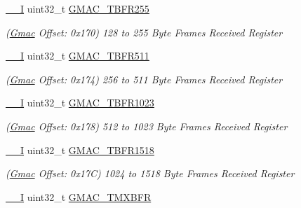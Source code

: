 \begin{DoxyCompactItemize}
\mbox{\hyperlink{core__cm7_8h_af63697ed9952cc71e1225efe205f6cd3}{\+\_\+\+\_\+I}} uint32\+\_\+t \mbox{\hyperlink{structGmac_ac0f973c8ea5412c3445ec37a342e0762}{G\+M\+A\+C\+\_\+\+T\+B\+F\+R255}}
\begin{DoxyCompactList}\small\item\em (\mbox{\hyperlink{structGmac}{Gmac}} Offset\+: 0x170) 128 to 255 Byte Frames Received Register \end{DoxyCompactList}\item 
\mbox{\label{structGmac_aa1e3416762c66cbee33559898f2612a8}} 
\mbox{\hyperlink{core__cm7_8h_af63697ed9952cc71e1225efe205f6cd3}{\+\_\+\+\_\+I}} uint32\+\_\+t \mbox{\hyperlink{structGmac_aa1e3416762c66cbee33559898f2612a8}{G\+M\+A\+C\+\_\+\+T\+B\+F\+R511}}
\begin{DoxyCompactList}\small\item\em (\mbox{\hyperlink{structGmac}{Gmac}} Offset\+: 0x174) 256 to 511 Byte Frames Received Register \end{DoxyCompactList}\item 
\mbox{\label{structGmac_a45ccd4adb6a2f5a5db7bff6beba01167}} 
\mbox{\hyperlink{core__cm7_8h_af63697ed9952cc71e1225efe205f6cd3}{\+\_\+\+\_\+I}} uint32\+\_\+t \mbox{\hyperlink{structGmac_a45ccd4adb6a2f5a5db7bff6beba01167}{G\+M\+A\+C\+\_\+\+T\+B\+F\+R1023}}
\begin{DoxyCompactList}\small\item\em (\mbox{\hyperlink{structGmac}{Gmac}} Offset\+: 0x178) 512 to 1023 Byte Frames Received Register \end{DoxyCompactList}\item 
\mbox{\label{structGmac_a78ec79285de9fb1b82d35f82b108f57a}} 
\mbox{\hyperlink{core__cm7_8h_af63697ed9952cc71e1225efe205f6cd3}{\+\_\+\+\_\+I}} uint32\+\_\+t \mbox{\hyperlink{structGmac_a78ec79285de9fb1b82d35f82b108f57a}{G\+M\+A\+C\+\_\+\+T\+B\+F\+R1518}}
\begin{DoxyCompactList}\small\item\em (\mbox{\hyperlink{structGmac}{Gmac}} Offset\+: 0x17C) 1024 to 1518 Byte Frames Received Register \end{DoxyCompactList}\item 
\mbox{\label{structGmac_a5cb420396b87d20c37112be692d13e0e}} 
\mbox{\hyperlink{core__cm7_8h_af63697ed9952cc71e1225efe205f6cd3}{\+\_\+\+\_\+I}} uint32\+\_\+t \mbox{\hyperlink{structGmac_a5cb420396b87d20c37112be692d13e0e}{G\+M\+A\+C\+\_\+\+T\+M\+X\+B\+FR}}

\end{DoxyCompactItemize}
